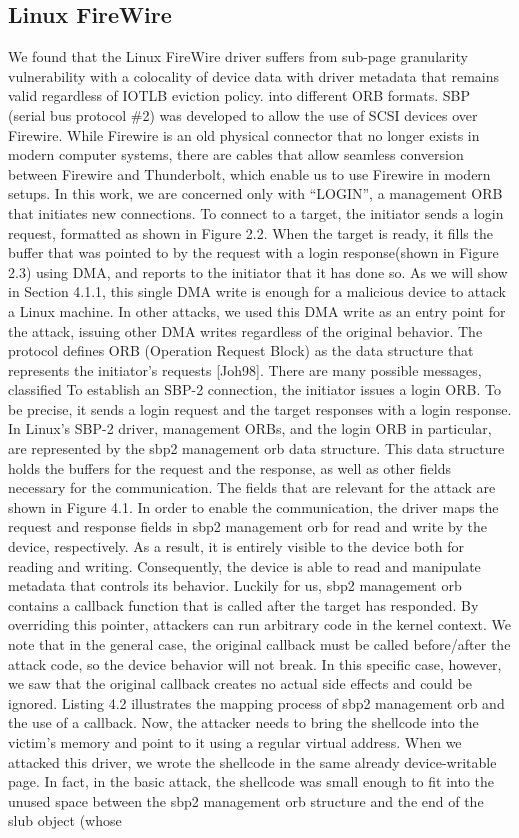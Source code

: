 \subsection{Linux FireWire}
We found that the Linux FireWire driver suffers from sub-page granularity vulnerability with a colocality of device data with driver metadata that remains valid regardless of IOTLB eviction policy. into different ORB formats. SBP (serial bus protocol \#2) was developed to allow the use of SCSI devices over Firewire. While Firewire is an old physical connector that no longer exists in modern computer systems, there are cables that allow seamless conversion between Firewire and Thunderbolt, which enable us to use Firewire in modern setups. In this work, we are concerned only with “LOGIN”, a management ORB that initiates new connections. To connect to a target, the initiator sends a login request, formatted as shown in Figure 2.2. When the target is ready, it fills the buffer that was pointed to by the request with a login response(shown in Figure 2.3) using DMA, and reports to the initiator that it has done so. As we will show in Section 4.1.1, this single DMA write is enough for a malicious device to attack a Linux machine. In other attacks, we used this DMA write as an entry point for the attack, issuing other DMA writes regardless of the original behavior. The protocol defines ORB (Operation Request Block) as the data structure that represents the initiator’s requests [Joh98]. There are many possible messages, classified To establish an SBP-2 connection, the initiator issues a login ORB. To be precise, it sends a login request and the target responses with a login response. In Linux’s SBP-2 driver, management ORBs, and the login ORB in particular, are represented by the sbp2 management orb data structure. This data structure holds the buffers for the request and the response, as well as other fields necessary for the communication. The fields that are relevant for the attack are shown in Figure 4.1. In order to enable the communication, the driver maps the request and response fields in sbp2 management orb for read and write by the device, respectively. As a result, it is entirely visible to the device both for reading and writing. Consequently, the device is able to read and manipulate metadata that controls its behavior. Luckily for us, sbp2 management orb contains a callback function that is called after the target has responded. By overriding this pointer, attackers can run arbitrary code in the kernel context. We note that in the general case, the original callback must be called before/after the attack code, so the device behavior will not break. In this specific case, however, we saw that the original callback creates no actual side effects and could be ignored. Listing 4.2 illustrates the mapping process of sbp2 management orb and the use of a callback. Now, the attacker needs to bring the shellcode into the victim’s memory and point to it using a regular virtual address. When we attacked this driver, we wrote the shellcode in the same already device-writable page. In fact, in the basic attack, the shellcode was small enough to fit into the unused space between the sbp2 management orb structure and the end of the slub object (whose 